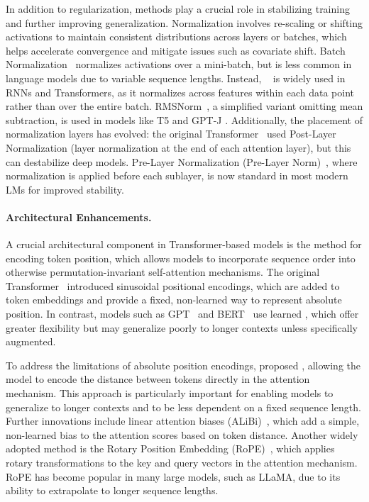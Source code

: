 In addition to regularization,  methods play a crucial role in stabilizing training and further improving generalization. Normalization involves re-scaling or shifting activations to maintain consistent distributions across layers or batches, which helps accelerate convergence and mitigate issues such as  covariate shift. Batch Normalization~\citep{ioffe2015batchnorm} normalizes activations over a mini-batch, but is less common in language models due to variable sequence lengths. Instead, ~\citep{ba2016layernorm} is widely used in RNNs and Transformers, as it normalizes across features within each data point rather than over the entire batch. RMSNorm~\citep{zhang2019rmsnorm}, a simplified variant omitting mean subtraction, is used in models like T5 \citep{raffel2020t5} and GPT-J \citep{eleutherai2021gptj}. Additionally, the placement of normalization layers has evolved: the original Transformer~\citep{vaswani2017attention} used Post-Layer Normalization (layer normalization at the end of each attention layer), but this can destabilize deep models. Pre-Layer Normalization (Pre-Layer Norm)~\citep{xiong2020layer}, where normalization is applied before each sublayer, is now standard in most modern LMs for improved stability.

\paragraph{Architectural Enhancements.}
A crucial architectural component in Transformer-based models is the method for encoding token position, which allows models to incorporate sequence order into otherwise permutation-invariant self-attention mechanisms. The original Transformer~\citep{vaswani2017attention} introduced sinusoidal positional encodings, which are added to token embeddings and provide a fixed, non-learned way to represent absolute position. In contrast, models such as GPT~\citep{radford2018gpt1} and BERT~\citep{devlin2019bert} use learned , which offer greater flexibility but may generalize poorly to longer contexts unless specifically augmented.

To address the limitations of absolute position encodings, \citet{shaw2018self} proposed , allowing the model to encode the distance between tokens directly in the attention mechanism. This approach is particularly important for enabling models to generalize to longer contexts and to be less dependent on a fixed sequence length. Further innovations include linear attention biases (ALiBi)~\citep{press2021train}, which add a simple, non-learned bias to the attention scores based on token distance. Another widely adopted method is the Rotary Position Embedding (RoPE)~\citep{su2024rope}, which applies rotary transformations to the key and query vectors in the attention mechanism. RoPE has become popular in many large models, such as LLaMA, due to its ability to extrapolate to longer sequence lengths.

